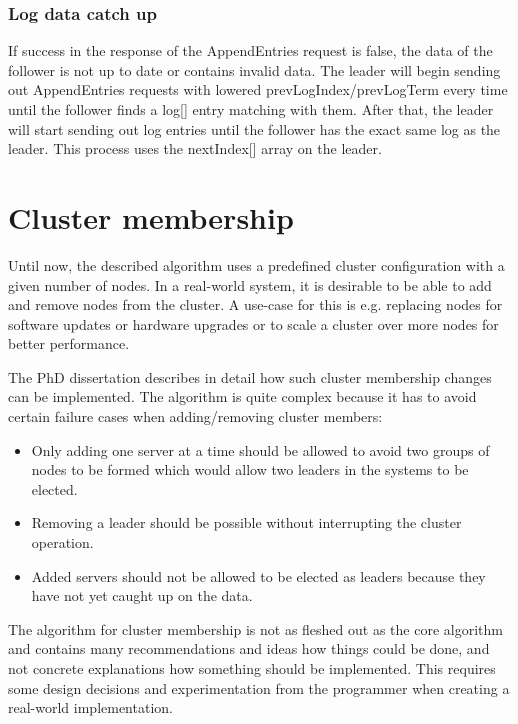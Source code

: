 \subsubsection*{Log data catch up}

If success in the response of the AppendEntries request is false, the data of the follower is not up to date or contains invalid data. The leader will begin sending out AppendEntries requests with lowered prevLogIndex/prevLogTerm every time until the follower finds a log[] entry matching with them. After that, the leader will start sending out log entries until the follower has the exact same log as the leader. This process uses the nextIndex[] array on the leader.





\section{Cluster membership}
Until now, the described algorithm uses a predefined cluster configuration with a given number of nodes. In a real-world system, it is desirable to
be able to add and remove nodes from the cluster. A use-case for this is e.g. replacing nodes for software updates or hardware upgrades or to
scale a cluster over more nodes for better performance.

The PhD dissertation \cite{raft_phd_thesis} describes in detail how such cluster membership changes can be implemented.
The algorithm is quite complex because it has to avoid certain failure cases when adding/removing cluster members:

\begin{itemize}
    \item Only adding one server at a time should be allowed to avoid two groups of nodes to be formed which would allow two leaders in the systems to be elected.
    \item Removing a leader should be possible without interrupting the cluster operation.
    \item Added servers should not be allowed to be elected as leaders because they have not yet caught up on the data.
\end{itemize}

The algorithm for cluster membership is not as fleshed out as the core algorithm and contains many recommendations and ideas how things could be done, and not 
concrete explanations how something should be implemented. This requires some design decisions and experimentation from the programmer when creating a real-world implementation.


